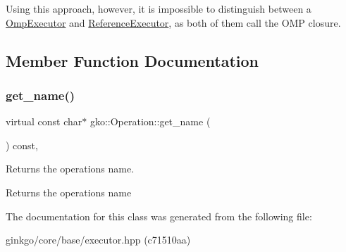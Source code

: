 Using this approach, however, it is impossible to distinguish between a \hyperlink{classgko_1_1OmpExecutor}{Omp\+Executor} and \hyperlink{classgko_1_1ReferenceExecutor}{Reference\+Executor}, as both of them call the O\+MP closure. 

\subsection{Member Function Documentation}
\mbox{\label{classgko_1_1Operation_ab3b940849d1daf02830f3387c52888d0}} 
\subsubsection{\texorpdfstring{get\+\_\+name()}{get\_name()}}
{\footnotesize\ttfamily virtual const char$\ast$ gko\+::\+Operation\+::get\+\_\+name (\begin{DoxyParamCaption}{ }\end{DoxyParamCaption}) const\hspace{0.3cm}{\ttfamily [virtual]}, {\ttfamily [noexcept]}}



Returns the operation\textquotesingle{}s name. 

\begin{DoxyReturn}{Returns}
the operation\textquotesingle{}s name 
\end{DoxyReturn}


The documentation for this class was generated from the following file\+:\begin{DoxyCompactItemize}
\item 
ginkgo/core/base/executor.\+hpp (c71510aa)\end{DoxyCompactItemize}
